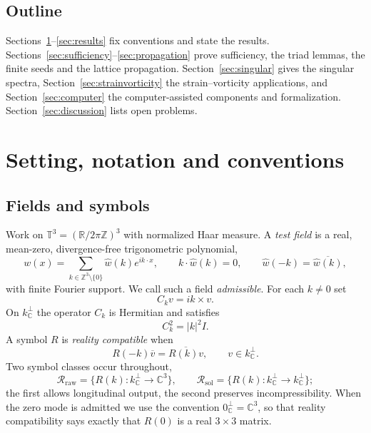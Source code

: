 \documentclass[11pt]{article}
\theoremstyle{definition}
\theoremstyle{remark}
\theoremstyle{plain}
\newcommand{\T}{\mathbb{T}}
\newcommand{\Z}{\mathbb{Z}}
\newcommand{\R}{\mathbb{R}}
\newcommand{\C}{\mathbb{C}}
\newcommand{\Ck}{C_k}
\newcommand{\kperp}{k_{\C}^{\perp}}
\begin{document}
\subsection{Outline}
\label{subsec:outline}

Sections~\ref{sec:setting}--\ref{sec:results} fix conventions and state the
results. Sections~\ref{sec:sufficiency}--\ref{sec:propagation} prove
sufficiency, the triad lemmas, the finite seeds and the lattice propagation.
Section~\ref{sec:singular} gives the singular spectra, Section~\ref{sec:strainvorticity}
the strain--vorticity applications, and Section~\ref{sec:computer} the
computer-assisted components and formalization. Section~\ref{sec:discussion}
lists open problems.

\section{Setting, notation and conventions}
\label{sec:setting}

\subsection{Fields and symbols}

Work on $\T^{3}=(\R/2\pi\Z)^{3}$ with normalized Haar measure. A
\emph{test field} is a real, mean-zero, divergence-free trigonometric
polynomial,
\begin{equation}
\label{eq:testfield}
w(x)=\sum_{k\in\Z^{3}\setminus\{0\}}\widehat w(k)e^{ik\cdot x},
\qquad
k\cdot\widehat w(k)=0,
\qquad
\widehat w(-k)=\overline{\widehat w(k)},
\end{equation}
with finite Fourier support. We call such a field \emph{admissible}. For each
$k\ne0$ set
\begin{equation}
\label{eq:curlsymbol}
\Ck v=ik\times v .
\end{equation}
On $\kperp$ the operator $\Ck$ is Hermitian and satisfies
\begin{equation}
\label{eq:curlsq}
\Ck^{2}=|k|^{2}I .
\end{equation}
A symbol $R$ is \emph{reality compatible} when
\begin{equation}
\label{eq:reality}
R(-k)\overline v=\overline{R(k)v},
\qquad v\in\kperp .
\end{equation}
Two symbol classes occur throughout,
\begin{equation}
\label{eq:classes}
\mathcal R_{\mathrm{raw}}
=\{R(k):\kperp\to\C^{3}\},
\qquad
\mathcal R_{\mathrm{sol}}
=\{R(k):\kperp\to\kperp\} ;
\end{equation}
the first allows longitudinal output, the second preserves
incompressibility. When the zero mode is admitted we use the convention
$0_{\C}^{\perp}=\C^{3}$, so that reality compatibility says exactly that
$R(0)$ is a real $3\times3$ matrix.
\end{document}
